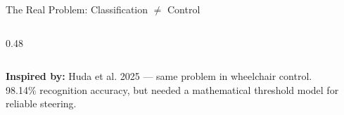 \documentclass[aspectratio=169]{beamer}
\begin{document}
\begin{frame}{The Real Problem: Classification $\neq$ Control}
\begin{columns}[c]
\begin{column}{0.48\textwidth}
    \end{column}
    \end{columns}

    \vspace{1em}
    \centering
    {\small \textbf{Inspired by:} Huda et al. 2025 --- same problem in wheelchair control.\\
    98.14\% recognition accuracy, but needed a mathematical threshold model for reliable steering.}
\end{frame}
\end{document}
